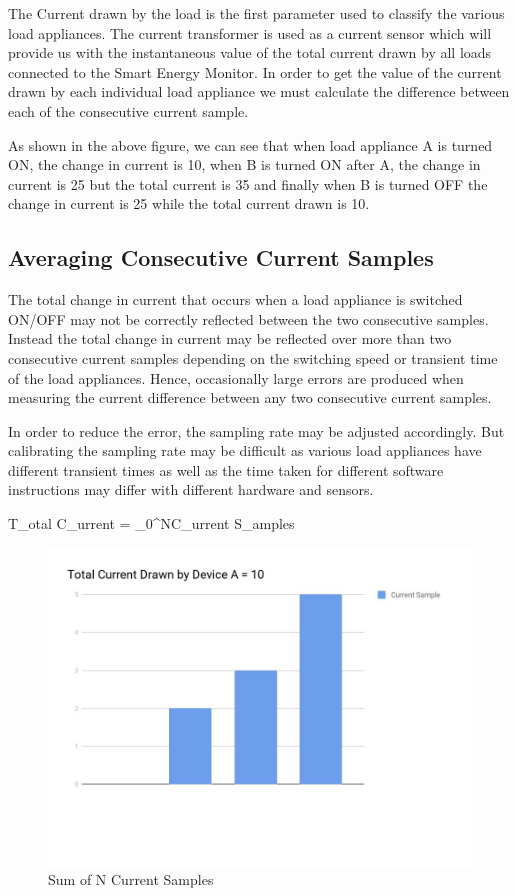 {The Current drawn by the load is the first parameter used to classify the various load appliances. The current transformer is used as a current sensor which will provide us with the instantaneous value of the total current drawn by all loads connected to the Smart Energy Monitor. 
In order to get the value of the current drawn by each individual load appliance we must calculate the difference between each of the consecutive current sample. 

As shown in the above figure, we can see that when load appliance A is turned ON, the change in current is 10, when B is turned ON after A, the change in current is 25 but the total current is 35 and finally when B is turned OFF the change in current is 25 while the total current drawn is 10.

\subsection{Averaging Consecutive Current Samples}
The total change in current that occurs when a load appliance is switched ON/OFF may not be correctly reflected between the two consecutive samples. Instead the total change in current may be reflected over more than two consecutive current samples depending on the switching speed or transient time of the load appliances. Hence, occasionally large errors are produced when measuring the current difference between any two consecutive current samples.

In order to reduce the error, the sampling rate may be adjusted accordingly. But calibrating the sampling rate may be difficult as various load appliances have different transient times as well as the time taken for different software instructions may differ with different hardware and sensors.

\centering
T_{otal} C_{urrent} =  \sum_{0}^{N}C_{urrent} S_{amples}

\begin{figure}[H]
	    \includegraphics[scale=0.50]{images/cdiff2.jpg}
	    \centering
	    \caption{Sum of N Current Samples}
	    \label{cdiff}
	\end{figure}


}

